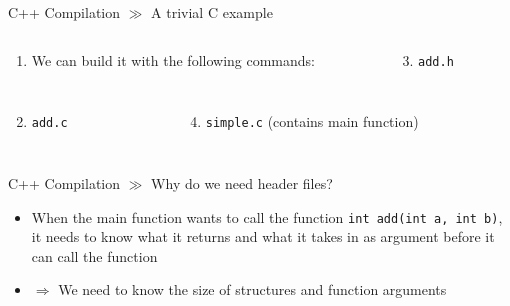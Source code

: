 \documentclass[10pt]{beamer}
\begin{document}
\begin{frame}{C++ Compilation $\gg$ A trivial C example}
\begin{columns}
	\begin{column}{0.675\textwidth}
		\begin{enumerate}
			\item We can build it with the following commands:
			\inputminted[bgcolor=lightGreyCustom,fontsize=\scriptsize]{sh}{./resources/build_trivial_c_program.sh}
		\end{enumerate}
	\end{column}
	\begin{column}{0.37\textwidth}  %
		\begin{enumerate}\setcounter{enumi}{2}
		\item \texttt{add.h}
		\inputminted[bgcolor=lightGreyCustom,fontsize=\scriptsize]{c}{./resources/add.h}
	\end{enumerate}
	\end{column}
\end{columns}
\vspace{-5mm}
\begin{columns}
	\begin{column}{0.4\textwidth}
		\begin{enumerate}\setcounter{enumi}{1}
			\item \texttt{add.c}
			\inputminted[bgcolor=lightGreyCustom,fontsize=\scriptsize]{c}{./resources/add.c}
		\end{enumerate}
	\end{column}
	\begin{column}{0.6\textwidth}  %
		\begin{enumerate}\setcounter{enumi}{3}
			\item \texttt{simple.c} (contains main function)
			\inputminted[bgcolor=lightGreyCustom,fontsize=\scriptsize]{c}{./resources/simple.c}
		\end{enumerate}
	\end{column}
\end{columns}
\end{frame}

\begin{frame}{C++ Compilation $\gg$ Why do we need header files?}
\begin{itemize}
	\item When the main function wants to call the function \texttt{int add(int a, int b){}}, it needs to know what it returns and what it takes in as argument before it can call the function 
	\item $\Rightarrow$ We need to know the size of structures and function arguments
\end{itemize}
\end{frame}
\end{document}
